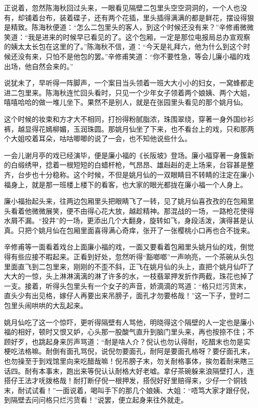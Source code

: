 \documentclass[12pt,UTF8]{ctexbook}
\begin{document}
{{{正说着，忽然陈海秋回过头来，一眼看见隔壁二包里头空空洞洞的，一个人也没有，却铺着台布，装着碟子，还有两个花插，里头插得满满的都是鲜花，摆设得狠是精致。陈海秋便道：“怎么二包里头的客人，到这个时候还没有来？”辛修甫微微笑道：“我是进来的时候早已看见的了。这个包厢，一定是那位电报局总办宣观察的姨太太长包在这里的了。”陈海秋不信，道：“今天是礼拜六，他为什么到这个时候还没有来，只怕不是他包的罢。”辛修甫笑道：“你不要性急，等会儿廉小福的戏出场，他自然会来的。”

说犹未了，早听得一阵脚声，一个案目当头领着一班大大小小的妇女，一窝蜂都走进二包里来。陈海秋连忙回头看时，只见一个少年女子领着两个娘姨、两个大姐，嘻嘻哈哈的做一堆儿坐下。果然不是别人，就是在张园里头看见的那个姚月仙。

这个时候的妆束和方才大不相同，打扮得粉腻脂浓，珠围翠绕，穿著一身外国纱衫裤，越显得花嫣柳媚，玉润珠圆。那姚月仙坐了下来，也不看台上的戏，只和那两个大姐咬着耳朵，咕咕唧唧的说了一会，也不知他说些什么。

一会儿谢月亭的戏已经演毕，便是廉小福的《长阪坡》登场。廉小福穿著一身簇新的白缎绣甲，捻着一根短短的白蜡杆枪，气昂昂、雄赳赳的走上场来，台容甚是整齐，台步也十分稳称。这个时候，不但是姚月仙的一双眼睛目不转睛的注定在廉小福身上，就是那一班楼上楼下的看客，也大家的眼光都拢在廉小福一个人身上。

廉小福抬起头来，往两边包厢里头把眼睛飞了一转，见了姚月仙喜孜孜的在包厢里头看着他微微展笑，便不由得心花大放，越趁精神。那混战的一场，一路枪花使得水屑不漏。“投井”的一场，更添出几个大翻身，旋转如飞，身段活泼，演得甚是认真。只把个姚月仙在包厢里面喜得满心奇痒，张开了一张樱桃小口再也合不拢来。

辛修甫等一面看着戏台上面廉小福的戏，一面又要看着包厢里头姚月仙的戏，倒觉得有些应接不暇起来。正看到好处，忽然听得“豁啷啷”一声响亮，一个茶碗从头包里面直飞到二包里来，刚刚的不歪不斜，正飞在姚月仙的头上，直把个姚月仙吓了大大的一惊，头上淋淋漓漓的淋了许多的水，一枝翡翠押发折作两截，珠花也掉了一支。接着，听得头包里头有一个女子的声音，娇滴滴的骂道：“格只烂污货末，直头少有出见格，嫁仔人再要出来吊膀子，面孔才勿要格哉！”这一下子，登时二包里头闹哄哄的大乱起来。

姚月仙吃了这一个惊吓，更听得隔壁有人骂他，明晓得这个隔壁的人一定也是廉小福的相好，顿时又恨又妒，心头那一股酸气直升到脑门里头来，再也按捺不住；不顾好歹，也跳起身来厉声骂道：“耐是啥人介？倪认也勿认得耐，吃醋末也勿是实梗吃法格嘛。耐倒有面孔骂倪，说倪勿要面孔，耐阿是要面孔格呀？要仔面孔末，也勿操至于到戏馆里向来吃醋哉嘛！倪吊膀子末，勿关耐格事体，挨勿着耐来瞎三话四。耐有本事末，跑出来等倪认认耐格大好老嘘。拿仔茶碗躲来浪隔壁打人，连搭仔王法才呒拨格哉！耐打断仔倪一根押发，搭倪好好里赔得来，少仔一个铜钱末，耐试试看！”一面说着，喝叫手下的那几个娘姨、大姐：“唔笃大家才跟仔倪，到隔壁去问问格只烂污货看！”说罢，便立起身来往外就走。

}}}
\end{document}
